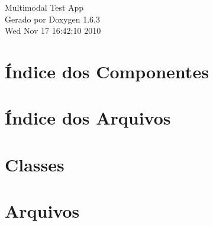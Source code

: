 \documentclass[a4paper]{book}
\begin{document}
\begin{titlepage}
\vspace*{7cm}
\begin{center}
{\Large Multimodal Test App }\\
\vspace*{1cm}
{\large Gerado por Doxygen 1.6.3}\\
\vspace*{0.5cm}
{\small Wed Nov 17 16:42:10 2010}\\
\end{center}
\end{titlepage}
\clearemptydoublepage
{}
\tableofcontents
\clearemptydoublepage
{}
\chapter{Índice dos Componentes}

\chapter{Índice dos Arquivos}

\chapter{Classes}

\chapter{Arquivos}

\printindex
\end{document}
